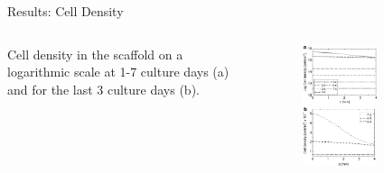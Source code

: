\documentclass[11pt,t]{beamer}
\begin{document}
\begin{frame}[fragile]{Results: Cell Density}  

	\begin{columns}[t]
		\begin{column}{.5\textwidth}
 Cell density in the scaffold on a logarithmic scale at 1-7 culture days  (a) and for the last 3 culture days (b).
	
 
		\end{column}
		\begin{column}{.5\textwidth}
			\vspace{-45pt}
			\begin{figure}
			\centering
			\includegraphics[width=0.6\textwidth]{math_tot_cell}
			
			\end{figure}
		\end{column}
	\end{columns}	
		
\end{frame}
\end{document}

